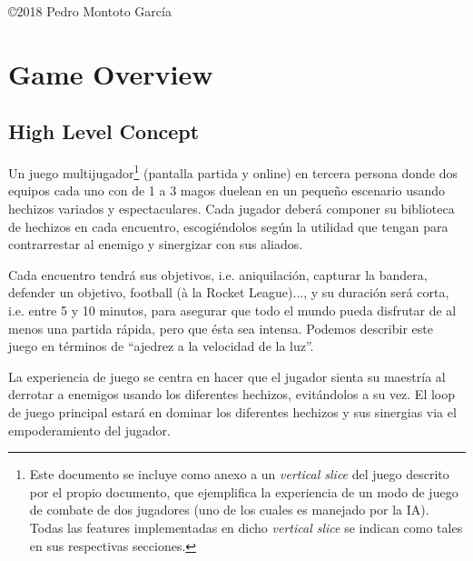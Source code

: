 \documentclass[12pt]{report}
\begin{document}
\vfill %

{\centering \hfill \copyright 2018 Pedro Montoto García} \\


\clearpage

\tableofcontents

\cleardoublepage

\setlength{\voffset}{0cm}
\setlength{\parindent}{1cm}

\chapter{Game Overview}

\section{High Level Concept}
\pagestyle{fancy}
\setcounter{page}{1}


Un juego multijugador\footnote{Este documento se incluye como anexo a un \textit{vertical slice} del juego descrito por el propio documento, que ejemplifica la experiencia de un modo de juego de combate de dos jugadores (uno de los cuales es manejado por la IA). Todas las features implementadas en dicho \textit{vertical slice} se indican como tales en sus respectivas secciones.} (pantalla partida y online) en tercera persona donde dos equipos cada uno con de 1 a 3 magos duelean en un pequeño escenario usando hechizos variados y espectaculares. Cada jugador deberá componer su biblioteca de hechizos en cada encuentro, escogiéndolos según la utilidad que tengan para contrarrestar al enemigo y sinergizar con sus aliados. 

Cada encuentro tendrá sus objetivos, i.e. aniquilación, capturar la bandera, defender un objetivo, football (à la Rocket League)..., y su duración será corta, i.e. entre 5 y 10 minutos, para asegurar que todo el mundo pueda disfrutar de al menos una partida rápida, pero que ésta sea intensa. Podemos describir este juego en términos de ``ajedrez a la velocidad de la luz''.

La experiencia de juego se centra en hacer que el jugador sienta su maestría al derrotar a enemigos usando los diferentes hechizos, evitándolos a su vez. El loop de juego principal estará en dominar los diferentes hechizos y sus sinergias via el empoderamiento del jugador.
\end{document}
